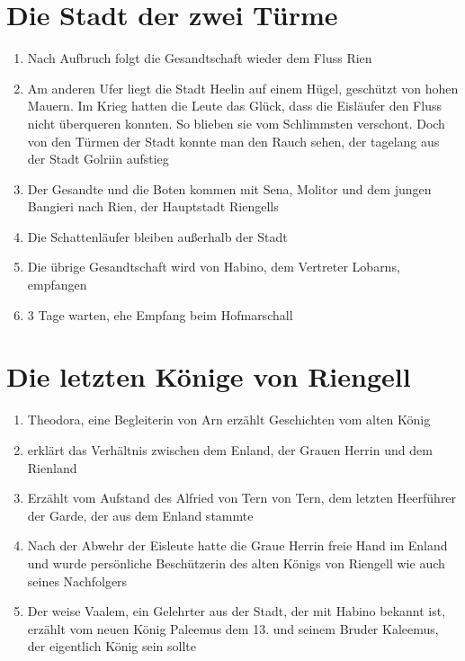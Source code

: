 \documentclass[12pt,a4paper,onecolumn,twoside,ngerman]{book}
\newcommand{\Tern}{Tern}
\newcommand{\Molitor}{Molitor}
\newcommand{\Sena}{Sena}
\newcommand{\Bangiri}{Bangieri}
\newcommand{\Arwed}{Alfried von \Tern}
\newcommand{\Enland}{Enland}
\newcommand{\Schattenlaufer}{Schattenläufer}
\newcommand{\Lobarn}{Lobarn}
\newcommand{\Arn}{Arn}
\newcommand{\Eislaufer}{Eisläufer}
\newcommand{\Eisleute}{Eisleute}
\newcommand{\Theodora}{Theodora}
\newcommand{\Rhinland}{Rienland}
\newcommand{\Rhingell}{Riengell}
\newcommand{\Helin}{Heelin}
\newcommand{\Golrin}{Golriin}
\newcommand{\Rhin}{Rien}
\newcommand{\Habino}{Habino}
\newcommand{\Valem}{Vaalem}
\newcommand{\Palemus}{Paleemus}
\newcommand{\Kalemus}{Kaleemus}
\begin{document}
\section[Die Stadt der zwei Türme]{Die Stadt der zwei Türme}
\begin{enumerate}
  \item Nach Aufbruch folgt die Gesandtschaft wieder dem Fluss {\Rhin}
  \item Am anderen Ufer liegt die Stadt {\Helin} auf einem Hügel, geschützt von hohen Mauern. Im Krieg hatten die Leute das Glück, dass die {\Eislaufer} den Fluss nicht überqueren konnten. So blieben sie vom Schlimmsten verschont. Doch von den Türmen der Stadt konnte man den Rauch sehen, der tagelang aus der Stadt {\Golrin} aufstieg
  \item Der Gesandte und die Boten kommen mit {\Sena}, {\Molitor} und  dem jungen {\Bangiri} nach {\Rhin}, der Hauptstadt \Rhingell{s}
  \item Die {\Schattenlaufer} bleiben außerhalb der Stadt
  \item Die übrige Gesandtschaft wird von {\Habino}, dem Vertreter {\Lobarn}s, empfangen
  \item 3 Tage warten, ehe Empfang beim Hofmarschall
\end{enumerate}

\section[Die Geschichte des Königshauses]{Die letzten Könige von {\Rhingell}}
\begin{enumerate}
  \item {\Theodora}, eine Begleiterin von {\Arn} erzählt Geschichten vom alten König
  \item erklärt das Verhältnis zwischen dem {\Enland}, der Grauen Herrin und dem {\Rhinland}
  \item Erzählt vom Aufstand des {\Arwed} von {\Tern}, dem letzten Heerführer der Garde, der aus dem {\Enland} stammte
  \item Nach der Abwehr der {\Eisleute} hatte die Graue Herrin freie Hand im {\Enland} und wurde persönliche Beschützerin des alten Königs von {\Rhingell} wie auch seines Nachfolgers
  \item Der weise {\Valem}, ein Gelehrter aus der Stadt, der mit {\Habino} bekannt ist, erzählt vom neuen König {\Palemus} dem 13. und seinem Bruder {\Kalemus}, der eigentlich König sein sollte
\end{enumerate}
\end{document}
